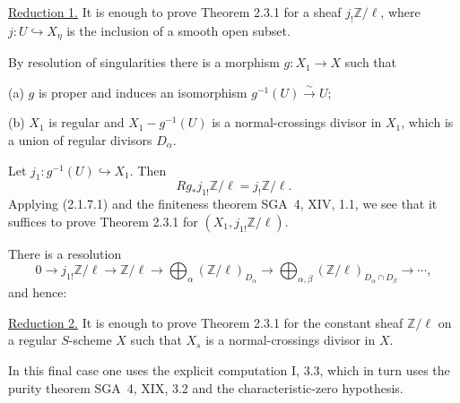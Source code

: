 \medskip
\noindent\underline{Reduction 1.}
It is enough to prove Theorem 2.3.1 for a sheaf
$j_!\mathbb Z/\ell$, where
$j:U\hookrightarrow X_\eta$ is the inclusion of a smooth open subset.

By resolution of singularities there is a morphism
$g:X_1\longrightarrow X$ such that

\medskip
\noindent(a) $g$ is proper and induces an isomorphism
$g^{-1}(U)\xrightarrow{\sim}U$;

\noindent(b) $X_1$ is regular and $X_1-g^{-1}(U)$ is a
normal-crossings divisor in $X_1$, which is a union of regular
divisors $D_\alpha$.

Let $j_1:g^{-1}(U)\hookrightarrow X_1$.  Then
\[
Rg_*j_{1!}\mathbb Z/\ell=j_!\mathbb Z/\ell.
\]
Applying (2.1.7.1) and the finiteness theorem SGA~4, XIV, 1.1, we see
that it suffices to prove Theorem 2.3.1 for
$(X_1,j_{1!}\mathbb Z/\ell)$.

There is a resolution
\[
0\longrightarrow j_{1!}\mathbb Z/\ell
\longrightarrow\mathbb Z/\ell
\longrightarrow\bigoplus_\alpha(\mathbb Z/\ell)_{D_\alpha}
\longrightarrow
\bigoplus_{\alpha,\beta}
(\mathbb Z/\ell)_{D_\alpha\cap D_\beta}
\longrightarrow\cdots,
\]
and hence:

\medskip
\noindent\underline{Reduction 2.}
It is enough to prove Theorem 2.3.1 for the constant sheaf
$\mathbb Z/\ell$ on a regular $S$-scheme $X$ such that $X_s$ is a
normal-crossings divisor in $X$.

In this final case one uses the explicit computation I, 3.3, which in
turn uses the purity theorem SGA~4, XIX, 3.2 and the characteristic-zero
hypothesis.
